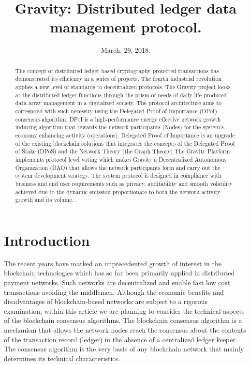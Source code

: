 \documentclass[a4paper,12pt]{article}
\title{Gravity: Distributed ledger data management protocol.}
\author{}
\date{March, 29, 2018.}
\begin{document}
\maketitle

\begin{abstract}
The concept of distributed ledger based cryptography protected transactions has
demonstrated its efficiency in a series of projects. The fourth industrial revolution applies a new level of standards to decentralized protocols. The Gravity project looks at the distributed ledger functions through the prism of needs of daily life produced data array management in a digitalized society. The protocol architecture aims to correspond with such necessity using the Delegated Proof of Importance (DPoI) consensus algorithm. DPoI is a high-performance energy effective network growth inducing algorithm that rewards the network participants (Nodes) for the system’s economy enhancing activity (operations). Delegated Proof of Importance is an upgrade of the existing blockchain solutions that integrates the concepts of the Delegated Proof of Stake (DPoS) and the Network Theory (the Graph Theory)
The Gravity Platform implements protocol level voting which makes Gravity a Decentralized
Autonomous Organization (DAO) that allows the network participants form and carry out the
system development strategy. The system protocol is designed in compliance with business
and end user requirements such as privacy, auditability and smooth volatility achieved due
to the dynamic emission proportionate to both the network activity growth and its volume. \cite{Metcalfe}.

\end{abstract}

\section {Introduction}
The recent years have marked an unprecedented growth of interest in the blockchain
technologies which has so far been primarily applied in distributed payment networks. Such
networks are decentralized and enable fast low cost transactions avoiding the middlemen.
Although the economic benefits and disadvantages of blockchain-based networks are
subject to a rigorous examination, within this article we are planning to consider the technical
aspects of the blockchain consensus algorithms. The blockchain consensus algorithm is a
mechanism that allows the network nodes reach the consensus about the contents of the
transaction record (ledger) in the absence of a centralized ledger keeper.
The consensus algorithm is the very basis of any blockchain network that mainly determines
its technical characteristics.
\end{document}
